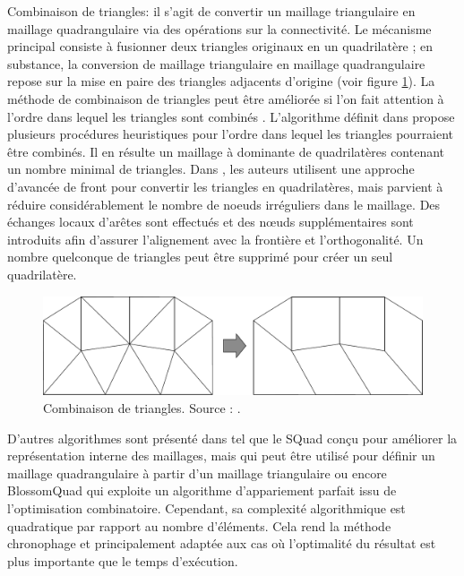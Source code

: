 Combinaison de triangles: il s'agit de convertir un maillage triangulaire en maillage quadrangulaire via des opérations sur la connectivité. Le mécanisme principal consiste à fusionner deux triangles originaux en un quadrilatère ; en substance, la conversion de maillage triangulaire en maillage quadrangulaire repose sur la mise en paire des triangles adjacents d'origine \cite{bommes2013quad} (voir figure \ref{fig:tri_to_quad_2}). La méthode de combinaison de triangles peut être améliorée si l'on fait attention à l'ordre dans lequel les triangles sont combinés \cite{owen1998survey}. L'algorithme définit dans \cite{lo1989generating} propose plusieurs procédures heuristiques pour l'ordre dans lequel les triangles pourraient être combinés. Il en résulte un maillage à dominante de quadrilatères contenant un nombre minimal de triangles. Dans \cite{owen1998quad}, les auteurs utilisent une approche d'avancée de front pour convertir les triangles en quadrilatères, mais parvient à réduire considérablement le nombre de noeuds irréguliers dans le maillage. Des échanges locaux d'arêtes sont effectués et des nœuds supplémentaires sont introduits afin d'assurer l'alignement avec la frontière et l'orthogonalité. Un nombre quelconque de triangles peut être supprimé pour créer un seul quadrilatère.

\begin{figure}[!h]
    \centering
    \includegraphics[scale=0.42]{images/tri_to_quad_2.png}
    \caption{Combinaison de triangles. Source : \cite{owen1998survey}.}
    \label{fig:tri_to_quad_2}
\end{figure}

D'autres algorithmes sont présenté dans \cite{bommes2013quad} tel que le SQuad \cite{gurung2011squad} conçu pour améliorer la représentation interne des maillages, mais  qui peut être utilisé pour définir un maillage quadrangulaire à partir d'un maillage triangulaire ou encore BlossomQuad \cite{remacle2012blossom} qui exploite un algorithme d'appariement parfait issu de l'optimisation combinatoire. Cependant, sa complexité algorithmique est quadratique par rapport au nombre d'éléments. Cela rend la méthode chronophage et principalement adaptée aux cas où l'optimalité du résultat est plus importante que le temps d'exécution.

